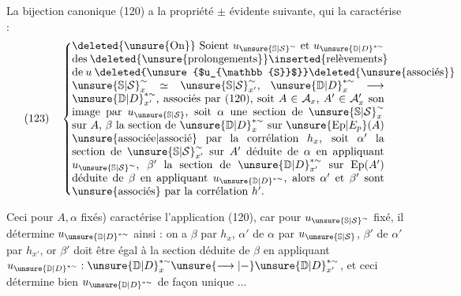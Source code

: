  La bijection canonique (120) a la propriété
$\pm$ évidente suivante, qui la caractérise :
\[
(123)\quad\left\{\vcenter{\hbox{\begin{minipage}{0.82\linewidth}
\deleted{\unsure{On}} Soient $u_{\unsure{\mathbb{S}|\mathcal{S}}^{\sim}}$ et
$u_{\unsure{\mathbb{D}|D}^{*\sim}}$ des
\deleted{\unsure{prolongements}}\inserted{relèvements} de $u$
\deleted{\unsure{$u_{\mathbb{S}}$}}\deleted{\unsure{associés}}
$\unsure{\mathbb{S}|\mathcal{S}}_x^{\sim}\simeq\unsure{\mathbb{S}|\mathcal{S}}_{x'}^{\sim}$,
$\unsure{\mathbb{D}|D}_x^{*\sim}\longrightarrow\unsure{\mathbb{D}|D}_{x'}^{*\sim}$,
associés par (120), soit $A\in\mathcal{A}_x$,
$A'\in\mathcal{A}'_x$ son image par
$u_{\unsure{\mathbb{S}|\mathcal{S}}}$, soit $\alpha$ une section de $\unsure{\mathbb{S}|\mathcal{S}}_x^{\sim}$ sur $A$,
$\beta$ la section de $\unsure{\mathbb{D}|D}_x^{*\sim}$ sur
$\unsure{\mathrm{Ep}|E_p}(A)$ \unsure{associée|associé} par la corrélation
$h_x$, soit $\alpha'$ la section de $\unsure{\mathbb{S}|\mathcal{S}}_{x'}^{\sim}$ sur $A'$
déduite de $\alpha$ en appliquant $u_{\unsure{\mathbb{S}|\mathcal{S}}^{\sim}}$,
$\beta'$ la section de $\unsure{\mathbb{D}|D}_{x'}^{*\sim}$ sur
$\mathrm{Ep}(A')$ déduite de $\beta$ en appliquant
$u_{\unsure{\mathbb{D}|D}^{*\sim}}$, alors $\alpha'$ et $\beta'$ sont
\unsure{associés} par la corrélation $h'$.
\end{minipage}}}\right.
\]



Ceci  \unsure{(}pour $A,\alpha$ fixés)
caractérise l'application  (120), car pour
$u_{\unsure{\mathbb{S}|\mathcal{S}}^{\sim}}$ fixé, il détermine $u_{\unsure{\mathbb{D}|D}^{*\sim}}$ ainsi :
on a $\beta$ par $h_x$, $\alpha'$  de $\alpha$ par
$u_{\unsure{\mathbb{S}|\mathcal{S}}}$, $\beta'$  de $\alpha'$ par $h_{x'}$,
or $\beta'$ doit être égal à la section déduite de $\beta$ en appliquant
$u_{\unsure{\mathbb{D}|D}^{*\sim}}:\unsure{\mathbb{D}|D}_x^{*\sim}
\unsure{\longrightarrow|-}\unsure{\mathbb{D}|D}_{x'}^{*\sim}$,
et ceci détermine bien $u_{\unsure{\mathbb{D}|D}^{*\sim}}$ de façon unique ...

